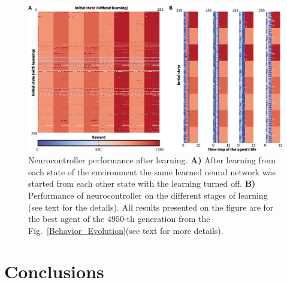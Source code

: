 \documentclass[letterpaper]{article}
\begin{document}
\begin{figure} [!t]
	\begin{center}
	\includegraphics[width=16cm]{Fig6.eps}
	\caption{Neurocontroller performance after learning. \textbf{A)} After learning from each state of the environment the same learned neural network was started from each other state with the learning turned off. \textbf{B)} Performance of neurocontroller on the different stages of learning (see text for the details). 
	All results presented on the figure are for the best agent of the $4950$-th generation from the Fig.~\ref{Behavior_Evolution}(see text for more details).}
	\label{Learning_Process}
	\end{center}
\end{figure}

\section{Conclusions}

\footnotesize


\end{document}

